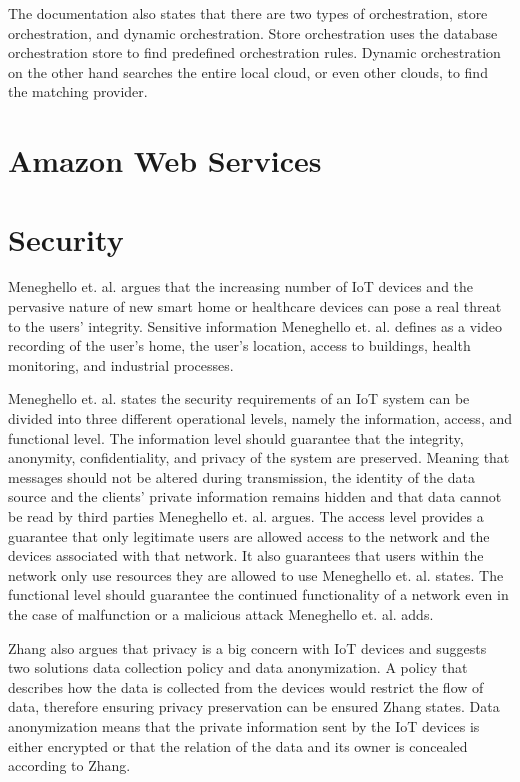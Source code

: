 The documentation also states that there are two types of orchestration, store orchestration, and dynamic orchestration.
Store orchestration uses the database orchestration store to find predefined orchestration rules.
Dynamic orchestration on the other hand searches the entire local cloud, or even other clouds, to find the matching provider.\cite{Github2021}

\section{Amazon Web Services}

\section{Security}
Meneghello et. al. argues that the increasing number of IoT devices and the pervasive nature of new smart home or healthcare devices can pose a real threat to the users' integrity.
Sensitive information Meneghello et. al. defines as a video recording of the user's home, the user's location, access to buildings, health monitoring, and industrial processes.\cite{Meneghello2019}

Meneghello et. al. states the security requirements of an IoT system can be divided into three different operational levels, namely the information, access, and functional level.
The information level should guarantee that the integrity, anonymity, confidentiality, and privacy of the system are preserved. 
Meaning that messages should not be altered during transmission, the identity of the data source and the clients' private information remains hidden and that data cannot be read by third parties Meneghello et. al. argues.
The access level provides a guarantee that only legitimate users are allowed access to the network and the devices associated with that network. 
It also guarantees that users within the network only use resources they are allowed to use Meneghello et. al. states.
The functional level should guarantee the continued functionality of a network even in the case of malfunction or a malicious attack Meneghello et. al. adds.\cite{Meneghello2019}

Zhang also argues that privacy is a big concern with IoT devices and suggests two solutions data collection policy and data anonymization.
A policy that describes how the data is collected from the devices would restrict the flow of data, therefore ensuring privacy preservation can be ensured Zhang states.
Data anonymization means that the private information sent by the IoT devices is either encrypted or that the relation of the data and its owner is concealed according to Zhang.\cite{Zhang2014}

